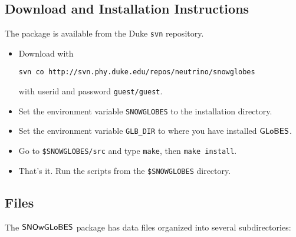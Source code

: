 \documentclass[12pt]{article}
\newcommand{\globes}{\sf{GLoBES}}
\newcommand{\snowglobes}{\sf{SNOwGLoBES}}
\begin{document}
\subsection{Download and Installation Instructions}

The package is available from the Duke \texttt{svn} repository.

\begin{itemize}
\item Download with

\noindent
\texttt{svn co http://svn.phy.duke.edu/repos/neutrino/snowglobes}

with userid and password \texttt{guest/guest}.

\item Set the environment variable \texttt{SNOWGLOBES} to the installation directory.  

\item Set the environment variable \texttt{GLB\_DIR} to where you have installed $\globes$.

\item Go to \texttt{\$SNOWGLOBES/src} and type \texttt{make}, then
\texttt{make install}.  

\item That's it.  Run the scripts from the \texttt{\$SNOWGLOBES} directory.

\end{itemize}

\subsection{Files}

The $\snowglobes$ package has data files organized into several subdirectories:
\end{document}
